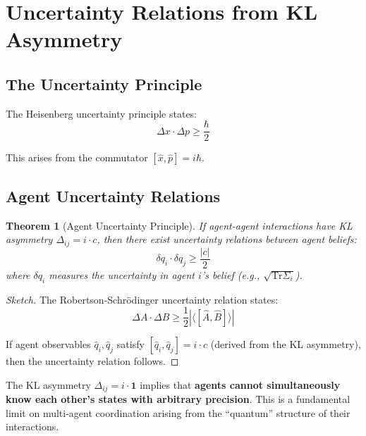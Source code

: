 \documentclass[11pt,a4paper]{article}
\newtheorem{theorem}{Theorem}[section]
\newcommand{\Tr}{\mathrm{Tr}}
\newcommand{\id}{\mathbf{1}}
\begin{document}
\section{Uncertainty Relations from KL Asymmetry}

\subsection{The Uncertainty Principle}

The Heisenberg uncertainty principle states:
\begin{equation}
    \Delta x \cdot \Delta p \geq \frac{\hbar}{2}
\end{equation}

This arises from the commutator $[\hat{x}, \hat{p}] = i\hbar$.

\subsection{Agent Uncertainty Relations}

\begin{theorem}[Agent Uncertainty Principle]
If agent-agent interactions have KL asymmetry $\Delta_{ij} = i \cdot c$, then there exist uncertainty relations between agent beliefs:
\begin{equation}
    \boxed{\delta q_i \cdot \delta q_j \geq \frac{|c|}{2}}
\end{equation}
where $\delta q_i$ measures the uncertainty in agent $i$'s belief (e.g., $\sqrt{\Tr \Sigma_i}$).
\end{theorem}

\begin{proof}[Sketch]
The Robertson-Schrödinger uncertainty relation states:
\begin{equation}
    \Delta A \cdot \Delta B \geq \frac{1}{2}|\langle[\hat{A}, \hat{B}]\rangle|
\end{equation}

If agent observables $\hat{q}_i, \hat{q}_j$ satisfy $[\hat{q}_i, \hat{q}_j] = i \cdot c$ (derived from the KL asymmetry), then the uncertainty relation follows.
\end{proof}

\begin{physicalinsight}
The KL asymmetry $\Delta_{ij} = i \cdot \id$ implies that \textbf{agents cannot simultaneously know each other's states with arbitrary precision}. This is a fundamental limit on multi-agent coordination arising from the ``quantum'' structure of their interactions.
\end{physicalinsight}
\end{document}
